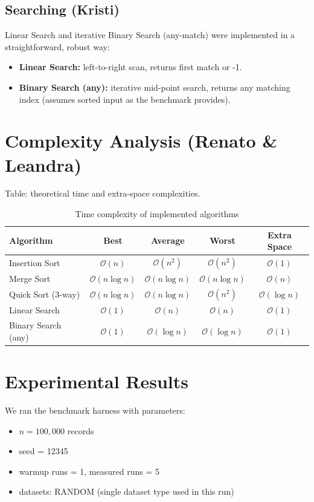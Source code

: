\documentclass[11pt,a4paper]{article}
\begin{document}
\subsection{Searching (Kristi)}
Linear Search and iterative Binary Search (any-match) were implemented in a straightforward, robust way:
\begin{itemize}
  \item \textbf{Linear Search:} left-to-right scan, returns first match or -1.
  \item \textbf{Binary Search (any):} iterative mid-point search, returns any matching index (assumes sorted input as the benchmark provides).
\end{itemize}

\section{Complexity Analysis (Renato \& Leandra)}
Table: theoretical time and extra-space complexities.

\begin{table}[H]
\centering
\caption{Time complexity of implemented algorithms}
\begin{tabular}{lcccc}
\toprule
\textbf{Algorithm} & \textbf{Best} & \textbf{Average} & \textbf{Worst} & \textbf{Extra Space} \\
\midrule
Insertion Sort & $\mathcal{O}(n)$ & $\mathcal{O}(n^2)$ & $\mathcal{O}(n^2)$ & $\mathcal{O}(1)$ \\
Merge Sort & $\mathcal{O}(n\log n)$ & $\mathcal{O}(n\log n)$ & $\mathcal{O}(n\log n)$ & $\mathcal{O}(n)$ \\
Quick Sort (3-way) & $\mathcal{O}(n\log n)$ & $\mathcal{O}(n\log n)$ & $\mathcal{O}(n^2)$ & $\mathcal{O}(\log n)$ \\
Linear Search & $\mathcal{O}(1)$ & $\mathcal{O}(n)$ & $\mathcal{O}(n)$ & $\mathcal{O}(1)$ \\
Binary Search (any) & $\mathcal{O}(1)$ & $\mathcal{O}(\log n)$ & $\mathcal{O}(\log n)$ & $\mathcal{O}(1)$ \\
\bottomrule
\end{tabular}
\end{table}

\section{Experimental Results}
We ran the benchmark harness with parameters:
\begin{itemize}
  \item $n = 100{,}000$ records
  \item seed = 12345
  \item warmup runs = 1, measured runs = 5
  \item datasets: RANDOM (single dataset type used in this run)
\end{itemize}
\end{document}
